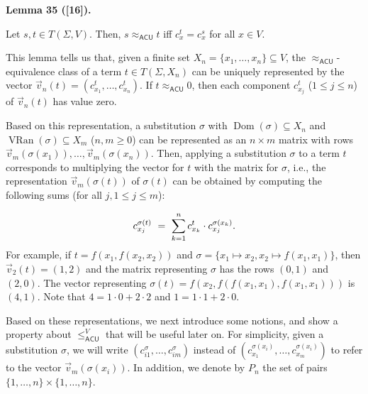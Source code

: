  
 
\par\medskip\noindent\textbf{Lemma 35 ([16]).}\par
 
 
Let $s,t\in T(\Sigma,V)$. Then, $s\approx_{\mathsf{ACU}}t$ iff $c^{t}_{x}=c^{s}_{x}$ for all $x\in V$.\par
 
 
 
 
This lemma tells us that, given a finite set $X_{n}=\{x_{1},\ldots,x_{n}\}\subseteq V$, the $\approx_{\mathsf{ACU}}$-equivalence class of a term $t\in T(\Sigma,X_{n})$ can be uniquely represented by the vector $\vec{v}_{n}(t)=(c^{t}_{x_{1}},\ldots,c^{t}_{x_{n}})$. If $t\approx_{\mathsf{ACU}}0$, then each component $c^{t}_{x_{j}}$ ($1\leq j\leq n$) of $\vec{v}_{n}(t)$ has value zero.\par
 
 
 
Based on this representation, a substitution $\sigma$ with $\operatorname{Dom}(\sigma)\subseteq X_{n}$ and $\operatorname{VRan}(\sigma)\subseteq X_{m}$ ($n,m\geq 0$) can be represented as an $n\times m$ matrix with rows $\vec{v}_{m}(\sigma(x_{1})),\ldots,\vec{v}_{m}(\sigma(x_{n}))$. Then, applying a substitution $\sigma$ to a term $t$ corresponds to multiplying the vector for $t$ with the matrix for $\sigma$, i.e., the representation $\vec{v}_{m}(\sigma(t))$ of $\sigma(t)$ can be obtained by computing the following sums (for all $j,1\leq j\leq m$):\par
    \[c^{\sigma(t)}_{x_{j}}\ =\ \sum\limits_{k=1}^{n}c^{t}_{x_{k}}\cdot c^{\sigma(x_%
{k})}_{x_{j}}.\]    
For example, if $t=f(x_{1},f(x_{2},x_{2}))$ and $\sigma=\{x_{1}\mapsto x_{2},x_{2}\mapsto f(x_{1},x_{1})\}$, then $\vec{v}_{2}(t)=(1,2)$ and the matrix representing $\sigma$ has the rows $(0,1)$ and $(2,0)$. The vector representing $\sigma(t)=f(x_{2},f(f(x_{1},x_{1}),f(x_{1},x_{1})))$ is $(4,1)$. Note that $4=1\cdot 0+2\cdot 2$ and $1=1\cdot 1+2\cdot 0$.\par
 
 
 
Based on these representations, we next introduce some notions, and show a property about $\leq_{\mathsf{ACU}}^{V}$ that will be useful later on. For simplicity, given a substitution $\sigma$, we will write $(c^{\sigma}_{i1},\ldots,c^{\sigma}_{im})$ instead of $(c^{\sigma(x_{i})}_{x_{1}},\ldots,c^{\sigma(x_{i})}_{x_{m}})$ to refer to the vector $\vec{v}_{m}(\sigma(x_{i}))$. In addition, we denote by $P_{n}$ the set of pairs $\{1,\ldots,n\}\times\{1,\ldots,n\}$.\par
 
